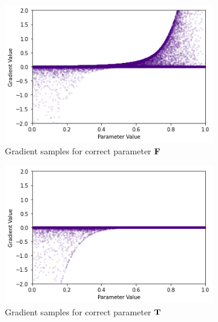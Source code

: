 \begin{figure}[h]
    \centering
    \begin{subfigure}[b]{0.47\textwidth}
        \centering
        \includegraphics[width=\textwidth]{imgs/grad_ss_10_falseparam.png}
        \caption{Gradient samples for correct parameter $\textbf{F}$}
        \label{fig:conjgrad10falsess}
    \end{subfigure}
    \begin{subfigure}[b]{0.47\textwidth}
        \centering
        \includegraphics[width=\textwidth]{imgs/grad_ss_10_trueparam.png}
        \caption{Gradient samples for correct parameter $\textbf{T}$}
        \label{fig:conjgrad10truess}
    \end{subfigure}
    \begin{subfigure}[b]{0.47\textwidth}
        \centering

\end{subfigure}
\end{figure}
